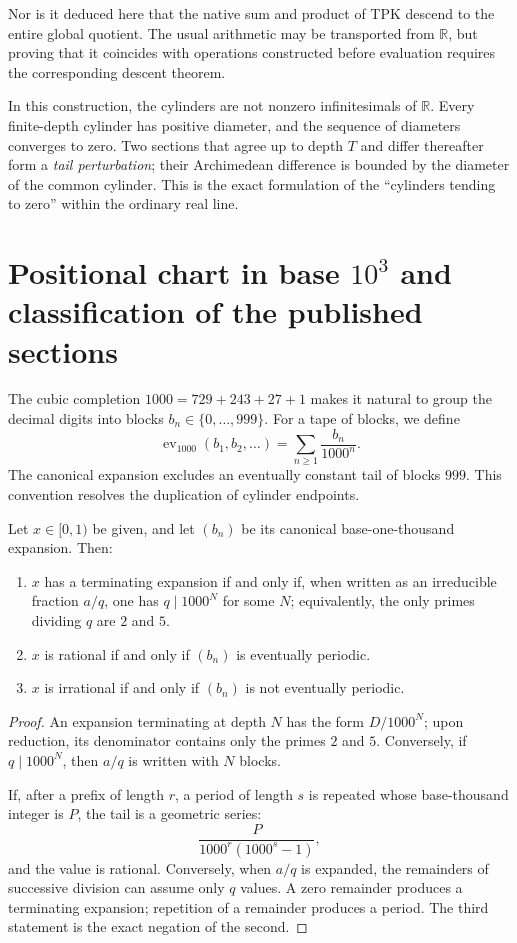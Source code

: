 Nor is it deduced here that the native sum and product of TPK descend to
the entire global quotient. The usual arithmetic may be transported from
\(\mathbb R\), but proving that it coincides with operations constructed before
evaluation requires the corresponding descent theorem.

In this construction, the cylinders are not nonzero infinitesimals of
\(\mathbb R\). Every finite-depth cylinder has positive diameter,
and the sequence of diameters converges to zero. Two sections that agree up to
depth \(T\) and differ thereafter form a \emph{tail
perturbation}; their Archimedean difference is bounded by the diameter of the common
cylinder. This is the exact formulation of the ``cylinders tending to zero''
within the ordinary real line.

\section{Positional chart in base \(10^3\) and classification of the published sections}

The cubic completion
\(1000=729+243+27+1\) makes it natural to group the decimal digits into blocks
\(b_n\in\{0,\ldots,999\}\). For a tape of blocks, we define
\[
 \operatorname{ev}_{1000}(b_1,b_2,\ldots)
 =\sum_{n\geq1}\frac{b_n}{1000^n}.
\]
The canonical expansion excludes an eventually constant tail of blocks
\(999\). This convention resolves the duplication of cylinder endpoints.

\begin{theorem}
\label{thm:taxonomia-base-mil}
Let \(x\in[0,1)\) be given, and let \((b_n)\) be its canonical base-one-thousand expansion.
Then:
\begin{enumerate}
\item \(x\) has a terminating expansion if and only if, when written as
an irreducible fraction \(a/q\), one has \(q\mid1000^N\) for some \(N\);
equivalently, the only primes dividing \(q\) are \(2\) and \(5\).
\item \(x\) is rational if and only if \((b_n)\) is eventually periodic.
\item \(x\) is irrational if and only if \((b_n)\) is not eventually
periodic.
\end{enumerate}
\end{theorem}

\begin{proof}
An expansion terminating at depth \(N\) has the form
\(D/1000^N\); upon reduction, its denominator contains only the primes \(2\) and
\(5\). Conversely, if \(q\mid1000^N\), then \(a/q\) is written with
\(N\) blocks.

If, after a prefix of length \(r\), a period of length
\(s\) is repeated whose base-thousand integer is \(P\), the tail is a geometric series:
\[
 \frac{P}{1000^r(1000^s-1)},
\]
and the value is rational. Conversely, when \(a/q\) is expanded, the remainders of
successive division can assume only \(q\) values. A zero remainder produces a
terminating expansion; repetition of a remainder produces a period. The third
statement is the exact negation of the second.
\end{proof}

